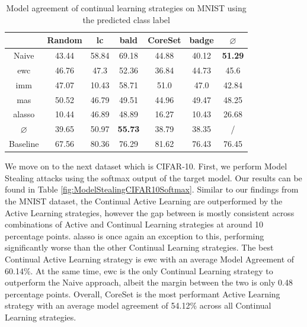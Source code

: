 \begin{table}[h]
    \centering
    \begin{tabular}{c | c c c c c | c } 
         & Random & \gls{lc} & \gls{bald} & CoreSet & \gls{badge} & $\varnothing$ \\ 
        \hline
        Naive & 43.44 & 58.84 & 69.18 & 44.88 & 40.12 & \textbf{51.29}\\
        \gls{ewc} &  46.76 & 47.3 & 52.36 & 36.84 & 44.73 & 45.6\\
        \gls{imm} & 47.07 & 10.43 & 58.71 & 51.0 & 47.0 & 42.84\\
        \gls{mas} & 50.52 & 46.79 & 49.51 & 44.96 & 49.47 & 48.25\\
        \gls{alasso} &  10.44 & 46.89 & 48.89 & 16.27 & 10.43 & 26.68\\
        \hline
        $\varnothing$ & 39.65 & 50.97 & \textbf{55.73} & 38.79 & 38.35 & /\\
        Baseline & 67.56 & 80.36 & 76.29 & 81.62 & 76.43 & 76.45\\
    \end{tabular}
    \caption{Model agreement of continual learning strategies on MNIST using the predicted class label}
    \label{fig:ModelStealingMNISTLabel}
\end{table}

We move on to the next dataset which is CIFAR-10. First, we perform Model Stealing attacks using the softmax output of the target model. Our results can be found in Table \ref{fig:ModelStealingCIFAR10Softmax}. Similar to our findings from the MNIST dataset, the Continual Active Learning
are outperformed by the Active Learning strategies, however the gap between is mostly consistent across combinations of Active and Continual Learning strategies at around 10 percentage points. \gls{alasso} is once again an exception to this, performing significantly worse than the other
Continual Learning strategies. The best Continual Active Learning strategy is \gls{ewc} with an average Model Agreement of 60.14\%. At the same time, \gls{ewc} is the only Continual Learning strategy to outperform the Naive approach, albeit the margin between the two is only 0.48 percentage points.
Overall, CoreSet is the most performant Active Learning strategy with an average model agreement of 54.12\% across all Continual Learning strategies. \par

